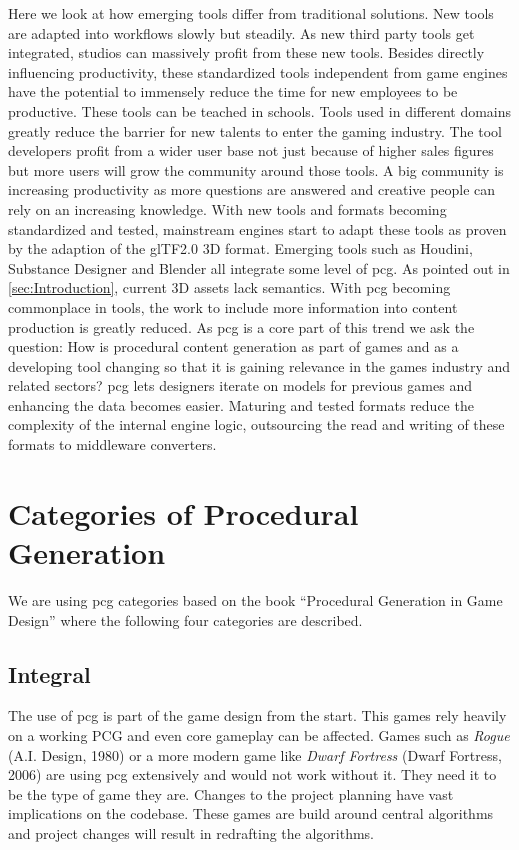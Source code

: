 \documentclass[10pt,a4paper]{article}
\begin{document}
\begin{multicols}{2}
Here we look at how emerging tools differ from traditional solutions. New tools are adapted into workflows slowly but steadily. As new third party tools get integrated, studios can massively profit from these new tools. Besides directly influencing productivity, these standardized tools independent from game engines have the potential to immensely reduce the time for new employees to be productive. These tools can be teached in schools. Tools used in different domains greatly reduce the barrier for new talents to enter the gaming industry. The tool developers profit from a wider user base not just because of higher sales figures but more users will grow the community around those tools. A big community is increasing productivity as more questions are answered and creative people can rely on an increasing knowledge. With new tools and formats becoming standardized and tested, mainstream engines start to adapt these tools as proven by the adaption of the glTF2.0 3D format\cite{Group2018}. Emerging tools such as Houdini, Substance Designer and Blender all integrate some level of \gls{pcg}. As pointed out in \autoref{sec:Introduction}, current 3D assets lack semantics. With \gls{pcg} becoming commonplace in tools, the work to include more information into content production is greatly reduced. As \gls{pcg} is a core part of this trend we ask the question: How is procedural content generation as part of games and as a developing tool changing so that it is gaining relevance in the games industry and related sectors? \gls{pcg} lets designers iterate on models for previous games and enhancing the data becomes easier. Maturing and tested formats reduce the complexity of the internal engine logic, outsourcing the read and writing of these formats to middleware converters.
\end{multicols}

\section{Categories of Procedural Generation}\label{sec:categories}
We are using \gls{pcg} categories based on the book “Procedural Generation in Game Design”\citep[p.~3]{Short:2017:PGG:3161477} where the following four categories are described.
\subsection{Integral}
\begin{multicols}{2} The use of \gls{pcg} is part of the game design from the start. This games rely heavily on a working PCG and even core gameplay can be affected. Games such as \textit{Rogue} (A.I. Design, 1980) or a more modern game like \textit{Dwarf Fortress} (Dwarf Fortress, 2006) are using \gls{pcg} extensively and would not work without it. They need it to be the type of game they are. Changes to the project planning have vast implications on the codebase. These games are build around central algorithms and project changes will result in redrafting the algorithms.
\end{multicols}
\end{document}
